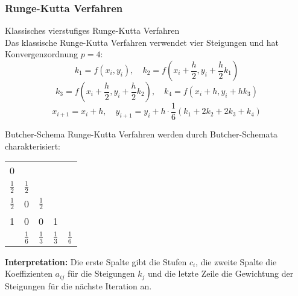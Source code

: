 \subsubsection{Runge-Kutta Verfahren}

\begin{theorem}{Klassisches vierstufiges Runge-Kutta Verfahren}\\
Das klassische Runge-Kutta Verfahren verwendet vier Steigungen und hat Konvergenzordnung $p = 4$:
\vspace{-2mm}\\
$$k_1 = f(x_i, y_i), \quad
k_2 = f(x_i + \frac{h}{2}, y_i + \frac{h}{2} k_1)$$
$$k_3 = f(x_i + \frac{h}{2}, y_i + \frac{h}{2} k_2), \quad
k_4 = f(x_i + h, y_i + h k_3)$$
$$x_{i+1} = x_i + h, \quad
y_{i+1} = y_i + h \cdot \frac{1}{6}(k_1 + 2k_2 + 2k_3 + k_4)$$
\end{theorem}

\begin{concept}{Butcher-Schema}
    Runge-Kutta Verfahren werden durch Butcher-Schemata charakterisiert:

    \begin{minipage}{0.45\textwidth}
        \begin{center}
        \begin{tabular}{c|cccc}
        0 & & & & \\
        $\frac{1}{2}$ & $\frac{1}{2}$ & & & \\
        $\frac{1}{2}$ & 0 & $\frac{1}{2}$ & & \\
        1 & 0 & 0 & 1 & \\
        \hline
        & $\frac{1}{6}$ & $\frac{1}{3}$ & $\frac{1}{3}$ & $\frac{1}{6}$
        \end{tabular}
        \end{center}
    \end{minipage}
    \begin{minipage}{0.54\textwidth}
        \textbf{Interpretation:} Die erste Spalte gibt die Stufen $c_i$, 
        die zweite Spalte die Koeffizienten $a_{ij}$ für die Steigungen $k_j$ und die letzte Zeile die Gewichtung der Steigungen für die nächste Iteration an.
    \end{minipage}

\end{concept}

